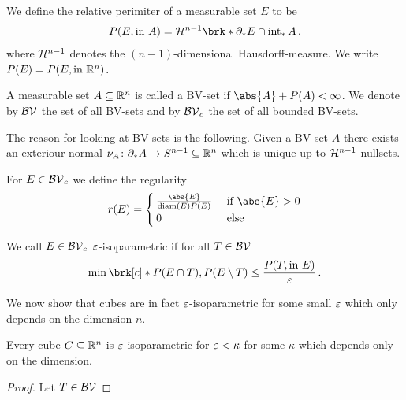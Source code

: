 \begin{definition}
We define the relative perimiter of a measurable set $E$ to be 
\begin{align*}
	P(E,\text{in }A)=\cH^{n-1}\brk*{\partial_*E\cap \interiour_*A}\,.
\end{align*}
where $\mathcal{H}^{n-1}$ denotes the $(n-1)$-dimensional Hausdorff-measure. We write $P(E)=P(E,\text{in }\mathbb{R}^n)$.
\end{definition}

\begin{definition}[BV-sets]
A measurable set $A\subseteq\mathbb{R}^n$ is called a BV-set if $ \abs{A}+P(A)<\infty$. We denote by $\mathcal{BV}$ the set of all BV-sets and by $\mathcal{BV}_c$ the set of all bounded BV-sets.
\end{definition}

The reason for looking at BV-sets is the following. Given a BV-set $A$ there exists an exteriour normal $\nu_A\colon\partial_*A\to S^{n-1}\subseteq \mathbb{R}^n$ which is unique up to $\mathcal{H}^{n-1}$-nullsets.



\begin{definition}
For $E\in \mathcal{BV}_c$ we define the regularity
\begin{align*}
	r(E)=\begin{cases}
		\frac{\abs{E}}{\diam(E)P(E)} &\text{ if }\abs{E}>0 \\
		0 &\text{ else}
	\end{cases}
\end{align*}
\end{definition}

\begin{definition}[isoparametric]
We call $E\in\mathcal{BV}_c$ $\varepsilon$-isoparametric if for all $T\in\mathcal{BV}$
\begin{align*}
	\min\brk[c]*{P(E\cap T),P(E\setminus T)}\leq \frac{P(T,\text{in }E)}{\e}\,.
\end{align*}
\end{definition}

We now show that cubes are in fact $\varepsilon$-isoparametric for some small $\varepsilon$ which only depends on the dimension $n$.
\begin{proposition}
Every cube $C\subseteq\mathbb{R}^n$ is $\varepsilon$-isoparametric for $\varepsilon<\kappa$ for some $\kappa$ which depends only on the dimension.
\end{proposition}
\begin{proof}
Let $T\in\mathcal{BV}$
\end{proof}

